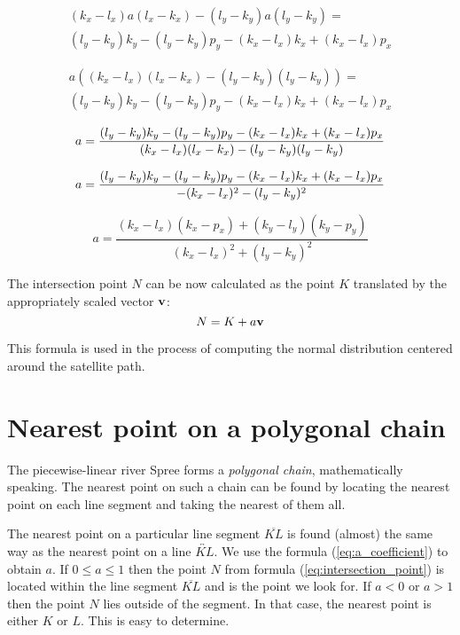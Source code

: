 \documentclass[a4paper,12pt]{article}
\begin{document}
\begin{equation*}
\begin{multlined}
(k_x - l_x) a (l_x - k_x) - (l_y - k_y) a (l_y - k_y) =\\
(l_y - k_y) k_y - (l_y - k_y) p_y - (k_x - l_x) k_x + (k_x - l_x) p_x
\end{multlined}
\end{equation*}

\begin{equation*}
\begin{multlined}
a ((k_x - l_x) (l_x - k_x) - (l_y - k_y) (l_y - k_y)) =\\
(l_y - k_y) k_y - (l_y - k_y) p_y - (k_x - l_x) k_x + (k_x - l_x) p_x
\end{multlined}
\end{equation*}

\begin{equation*}
  a = \frac{(l_y - k_y)k_y - (l_y - k_y)p_y - (k_x - l_x)k_x + (k_x - l_x)p_x}{(k_x - l_x)(l_x - k_x) - (l_y - k_y)(l_y - k_y)}\\
\end{equation*}

\begin{equation*}
  a = \frac{(l_y - k_y)k_y - (l_y - k_y)p_y - (k_x - l_x)k_x + (k_x - l_x)p_x}{- (k_x - l_x)^2 - (l_y - k_y)^2}\\
\end{equation*}

\begin{equation}
  a = \frac{(k_x - l_x)(k_x - p_x) + (k_y - l_y)(k_y - p_y)}{(k_x - l_x)^2 + (l_y - k_y)^2}\label{eq:a_coefficient}
\end{equation}

The intersection point \(N\) can be now calculated as the point \(K\)
translated by the appropriately scaled vector \(\vb{v}\):
\begin{equation}
N = K + a\vb{v}\label{eq:intersection_point}
\end{equation}

This formula is used in the process of computing the normal distribution centered around the satellite path.

\section{Nearest point on a polygonal chain}

The piecewise-linear river Spree forms a \emph{polygonal chain}, mathematically speaking.
The nearest point on such a chain can be found by locating the nearest point on each line segment and
taking the nearest of them all.

The nearest point on a particular line segment \(\overline{KL}\)
is found (almost) the same way as the nearest point on a line \(\overleftrightarrow{KL}\).
We use the formula (\ref{eq:a_coefficient}) to obtain \(a\).
If \(0 \leq a \leq 1\) then the point \(N\) from formula (\ref{eq:intersection_point})
is located within the line segment \(\overline{KL}\) and is the point we look for.
If \(a < 0\) or \(a > 1\) then the point \(N\) lies outside of the segment. In that case, the nearest point
is either \(K\) or \(L\). This is easy to determine.
\end{document}
